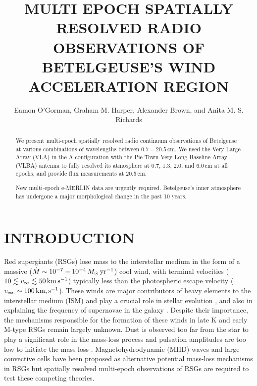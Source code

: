 \documentclass[iop]{emulateapj}
\begin{document}
\title{MULTI EPOCH SPATIALLY RESOLVED RADIO OBSERVATIONS OF BETELGEUSE'S WIND ACCELERATION REGION}


\author{Eamon O'Gorman, Graham M. Harper, Alexander Brown, and Anita M. S. Richards}



\begin{abstract}
We present multi-epoch spatially resolved radio continuum observations of Betelgeuse at various combinations of wavelengths between $0.7-20.5$\,cm.  We used the Very Large Array (VLA) in the A configuration with the Pie Town Very Long Baseline Array (VLBA) antenna to fully resolved its atmosphere at 0.7, 1.3, 2.0, and 6.0\,cm at all epochs, and provide flux measurements at 20.5\,cm.


 New multi-epoch e-MERLIN data are urgently required. Betelgeuse's inner atmosphere has undergone a major morphological change in the past 10 years.

\end{abstract}


\section{INTRODUCTION}
Red supergiants (RSGs) lose mass to the interstellar medium in the form of a massive ($\dot{M} \sim 10^{-7} - 10^{-4}\,M_{\odot}\,\rm{yr}^{-1}$) cool wind, with terminal velocities ($10\lesssim v_{\infty}\lesssim 50\,{\rm{km}}\,\rm{s}^{-1}$) typically less than the photospheric escape velocity  ($v_{\rm{esc}} \sim 100\,\rm{km},\rm{s}^{-1}$). These winds are major contributors of heavy elements to the interstellar medium (ISM) and play a crucial role in stellar evolution \citep{chiosi_1986}, and also in explaining the frequency of supernovae in the galaxy \citep[e.g.,][]{van_loon_2010}. Despite their importance, the mechanisms responsible for the formation of these winds in late K and early M-type RSGs remain largely unknown. Dust is observed too far from the star to play a significant role in the mass-loss process \citep{danchi_1994} and pulsation amplitudes are too low to initiate the mass-loss \citep{smith_1989}. Magnetohydrodynamic (MHD) waves \citep[e.g.,][]{thirumalai_2012} and large convective cells \citep[e.g.,][]{josselin_2007} have been proposed as alternative potential mass-loss mechanisms in RSGs but spatially resolved multi-epoch observations of RSGs are required to test these competing theories.
\end{document}
